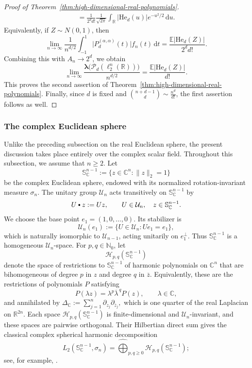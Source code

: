 \documentclass[11pt,showkeys]{amsart}
\newcommand{\hbullet}{\mathbin{\vcenter{\hbox{\scalebox{0.7}{$\bullet$}}}}}
\begin{document}
\begin{proof}[Proof of Theorem~\ref{thm:high-dimensional-real-polynomials}]
\[\begin{split}
=
\frac{1}{2^d d!}
\frac{1}{\sqrt{2\pi}}
\int_{\mathbb R}
|\mathrm{He}_d(u)|e^{-u^2/2}\,\mathrm{d} u.
\end{split}
\]
Equivalently, if $Z\sim N(0,1)$, then
\[
\lim_{n\to\infty}
\frac{1}{n^{d/2}}
\int_{-1}^{1}
\bigl|P_d^{(\alpha,\alpha)}(t)\bigr|
f_n(t)\,\mathrm{d} t
=
\frac{\mathbb E|\mathrm{He}_d(Z)|}{2^d d!}.
\]
Combining this with $A_n\to2^d$, we obtain
\[
\lim_{n\to\infty}
\frac{
\boldsymbol\lambda\bigl(\mathcal P_d(\ell_2^n(\mathbb R))\bigr)}
{n^{d/2}}
=
\frac{\mathbb E|\mathrm{He}_d(Z)|}{d!}.
\]
This proves the second assertion of Theorem~\ref{thm:high-dimensional-real-polynomials}.
Finally, since \(d\) is fixed and \( \binom{n+d-1}{d} \sim \frac{n^d}{d!}  \), the first assertion follows as well.
\end{proof}


\subsubsection{The complex Euclidean sphere}
\label{sec:complex-sphere}
Unlike the preceding subsection on the real Euclidean sphere, the
present discussion takes place entirely over the complex scalar field.
Throughout this subsection, we assume that \(n\geq 2\). Let
\[
    \mathbb S_{\mathbb C}^{n-1}
    :=
    \{z\in\mathbb C^n:\|z\|_2=1\}
\]
be the complex Euclidean sphere, endowed with its normalized
rotation-invariant measure \(\sigma_n\). The unitary group
\(\mathcal U_n\) acts transitively on
\(\mathbb S_{\mathbb C}^{n-1}\) by
\[
    U\hbullet z:=Uz,
    \qquad
    U\in\mathcal U_n,\quad
    z\in\mathbb S_{\mathbb C}^{n-1}.
\]
We choose the base point \(e_1=(1,0,\ldots,0)\). Its stabilizer is
\[
    \mathcal U_n(e_1)
    :=
    \{U\in\mathcal U_n:Ue_1=e_1\},
\]
which is naturally isomorphic to \(\mathcal U_{n-1}\), acting
unitarily on \(e_1^\perp\). Thus
\(\mathbb S_{\mathbb C}^{n-1}\) is a homogeneous
\(\mathcal U_n\)-space.
For \(p,q\in\mathbb N_0\), let
\[
    \mathcal H_{p,q}(\mathbb S_{\mathbb C}^{n-1})
\]
denote the space of restrictions to
\(\mathbb S_{\mathbb C}^{n-1}\) of harmonic polynomials on
\(\mathbb C^n\) that are bihomogeneous of degree \(p\) in \(z\) and
degree \(q\) in \(\overline z\). Equivalently, these are the restrictions of polynomials \(P\) satisfying
\[
    P(\lambda z)
    =
    \lambda^p\overline{\lambda}^{\,q}P(z),
    \qquad
    \lambda\in\mathbb C,
\]
and annihilated by
\(
    \Delta_{\mathbb C}
    :=
    \sum_{j=1}^n
    \partial_{z_j}\partial_{\overline z_j},
\)
which is one quarter of the real Laplacian on \(\mathbb R^{2n}\).
Each space
\(\mathcal H_{p,q}(\mathbb S_{\mathbb C}^{n-1})\) is
finite-dimensional and \(\mathcal U_n\)-invariant, and these spaces
are pairwise orthogonal. Their Hilbertian direct sum gives the
classical complex spherical harmonic decomposition
\begin{equation}
\label{eq:L2-complex-harmonic-decomposition}
    L_2(\mathbb S_{\mathbb C}^{n-1},\sigma_n)
    =
    \widehat{\bigoplus}_{p,q\geq 0}
    \mathcal H_{p,q}(\mathbb S_{\mathbb C}^{n-1});
\end{equation}
see, for example, \cite{defant2026ryll}.
\end{document}

